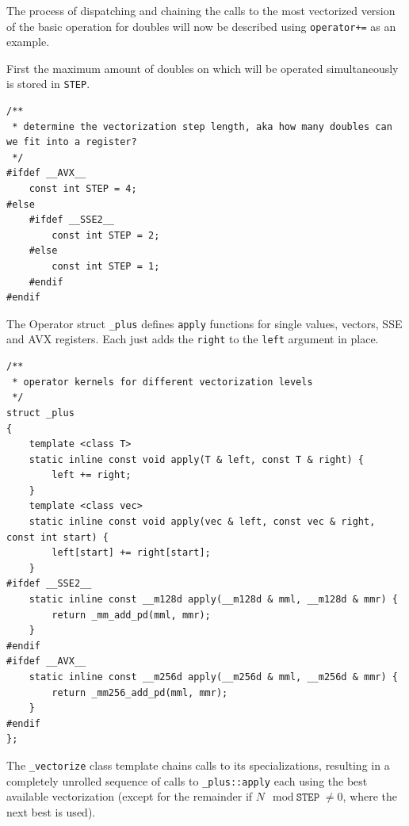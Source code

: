 \documentclass[a4paper]{scrartcl}
\begin{document}
The process of dispatching and chaining the calls to the most vectorized version of the basic operation for doubles will now be described using
\texttt{operator+=} as an example.

First the maximum amount of doubles on which will be operated simultaneously is stored in \texttt{STEP}.
\begin{lstlisting}                                                                                                    
/** 
 * determine the vectorization step length, aka how many doubles can we fit into a register? 
 */
#ifdef __AVX__
    const int STEP = 4;
#else
    #ifdef __SSE2__
        const int STEP = 2;
    #else
        const int STEP = 1;
    #endif
#endif                                                                                                                  
\end{lstlisting}

The Operator struct \texttt{\_plus} defines \texttt{apply} functions for single values, vectors, SSE and AVX registers.
Each just adds the \texttt{right} to the \texttt{left} argument in place.

\begin{lstlisting}
/**
 * operator kernels for different vectorization levels
 */
struct _plus
{
    template <class T>
    static inline const void apply(T & left, const T & right) {
        left += right;
    }
    template <class vec>
    static inline const void apply(vec & left, const vec & right, const int start) {
        left[start] += right[start];
    }
#ifdef __SSE2__
    static inline const __m128d apply(__m128d & mml, __m128d & mmr) {
        return _mm_add_pd(mml, mmr);
    }
#endif
#ifdef __AVX__
    static inline const __m256d apply(__m256d & mml, __m256d & mmr) {
        return _mm256_add_pd(mml, mmr);
    }
#endif
};
\end{lstlisting}

The \texttt{\_vectorize} class template chains calls to its specializations, resulting in a completely unrolled sequence of 
calls to \texttt{\_plus::apply} each using the best available vectorization (except for the remainder if $N \mod \texttt{STEP} \neq 0$, where the next best is used).
\end{document}

